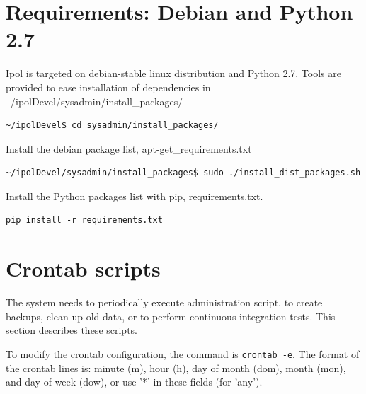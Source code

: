 \documentclass[a4paper,12pt]{article}
\begin{document}
\section{Requirements: Debian and Python 2.7}

Ipol is targeted on debian-stable linux distribution and Python 2.7.
Tools are provided to ease installation of dependencies in ~/ipolDevel/sysadmin/install\_packages/
\begin{verbatim}
~/ipolDevel$ cd sysadmin/install_packages/
\end{verbatim}


Install the debian package list, apt-get\_requirements.txt
\begin{verbatim}
~/ipolDevel/sysadmin/install_packages$ sudo ./install_dist_packages.sh
\end{verbatim}

Install the Python packages list with pip, requirements.txt.
\begin{verbatim}
pip install -r requirements.txt
\end{verbatim}


\section{Crontab scripts}
The system needs to periodically execute administration script, to create backups, clean up old data, or to perform continuous integration tests. This section describes these scripts.

To modify the crontab configuration, the command is {\tt crontab -e}. The format of the crontab lines is: minute (m), hour (h), day of month (dom), month (mon), and day of week (dow), or use '*' in these fields (for 'any').
\end{document}
